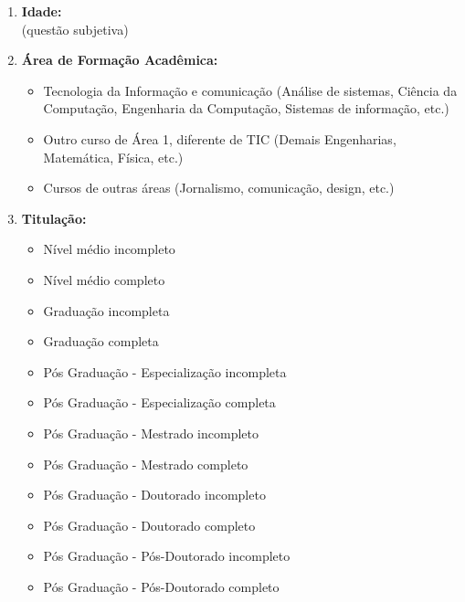 \begin{enumerate}[label=\bf A\arabic*,leftmargin=1.8cm]
\begin{enumerate}[label= \arabic*]
        \item \textbf{Idade:}\\
        (questão subjetiva)
        
        \item \textbf{Área de Formação Acadêmica:}
        \begin{itemize}
            \item Tecnologia da Informação e comunicação (Análise de sistemas, Ciência da Computação, Engenharia da Computação, Sistemas de informação, etc.)
            \item Outro curso de Área 1, diferente de TIC (Demais Engenharias, Matemática, Física, etc.)
            \item Cursos de outras áreas (Jornalismo, comunicação, design, etc.)
        \end{itemize}
        
        \item \textbf{Titulação:}
        \begin{itemize}
            \item Nível médio incompleto
            \item Nível médio completo
            \item Graduação incompleta
            \item Graduação completa
            \item Pós Graduação - Especialização incompleta
            \item Pós Graduação - Especialização completa
            \item Pós Graduação - Mestrado incompleto
            \item Pós Graduação - Mestrado completo
            \item Pós Graduação - Doutorado incompleto
            \item Pós Graduação - Doutorado completo
            \item Pós Graduação - Pós-Doutorado incompleto
            \item Pós Graduação - Pós-Doutorado completo
        \end{itemize}
        

\end{enumerate}
\end{enumerate}

